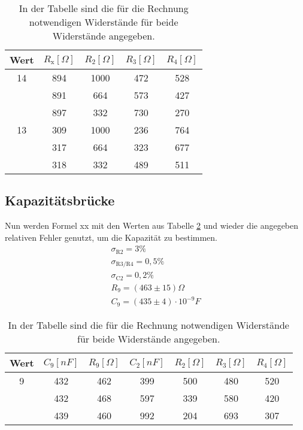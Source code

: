 \documentclass[titlepage = firstcover]{scrartcl}
\begin{document}
  \begin{table}[h]
    \centering
    \caption{In der Tabelle sind die für die Rechnung notwendigen Widerstände für beide Widerstände angegeben.}
    \label{tab:Wheaton}
    \begin{tabular}{c c c c c}
      \toprule
      {Wert} & {$R_{\text{x}} [\Omega]$} & {$R_{\text{2}} [\Omega]$} & {$R_{\text{3}} [\Omega]$} & {$R_{\text{4}} [\Omega]$} \\
      \midrule 
      14 & 894 & 1000 & 472 & 528  \\
       & 891 & 664 & 573 & 427 \\
       & 897 & 332 & 730 & 270 \\
      13 & 309 & 1000 & 236 & 764 \\
       & 317 & 664 & 323 & 677 \\
       & 318 & 332 & 489 & 511 \\
      \bottomrule
    \end{tabular}
  \end{table}

  \subsection{Kapazitätsbrücke}
  Nun werden Formel xx mit den Werten aus Tabelle \ref{tab:Kap} und wieder die angegeben relativen Fehler genutzt, um die Kapazität zu bestimmen.
  \begin{align*}
    \sigma_{\text{R2}} = 3 \% \\
    \sigma_{\text{R3/R4}} = 0,5 \% \\
    \sigma_{\text{C2}} = 0,2 \% \\
    R_9 = (463 \pm 15) \Omega\\
    C_9 = (435 \pm 4) \cdot 10^{-9} F
  \end{align*}

  \begin{table}[h]
    \centering
    \caption{In der Tabelle sind die für die Rechnung notwendigen Widerstände für beide Widerstände angegeben.}
    \label{tab:Kap}
    \begin{tabular}{c c c c c c c}
      \toprule
      {Wert} & {$C_{\text{9}} [nF]$} & {$R_{\text{9}} [\Omega]$} & {$C_{\text{2}} [nF]$} & {$R_{\text{2}} [\Omega]$} & {$R_{\text{3}} [\Omega]$} & {$R_{\text{4}} [\Omega]$} \\
      \midrule 
      9 & 432 & 462 &399 & 500 & 480 & 520  \\
       & 432 & 468 & 597 & 339 & 580 & 420 \\
       & 439 & 460 & 992 & 204 & 693 & 307 \\
      \bottomrule
    \end{tabular}
  \end{table}
\end{document}
